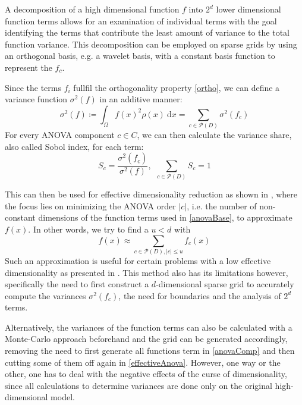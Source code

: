 \documentclass[
  a4paper,  %
  twoside,  %
  bibliography=totoc,
  headsepline,
  cleardoublepage=empty,
  parskip=half,
  draft=false
]{scrbook}
\begin{document}
A decomposition of a high dimensional function $f$ into $2^d$ lower dimensional function terms allows for an examination of individual terms with the goal identifying the terms that contribute the least amount of variance to the total function variance.
This decomposition can be employed on sparse grids by using an orthogonal basis, e.g. a wavelet basis, with a constant basis function to represent the $f_c$.

Since the terms $f_i$ fullfil the orthogonality property \eqref{ortho}, we can define a variance function $\sigma^2(f)$ in an additive manner:
\begin{equation}
\sigma^2(f) \coloneqq \int_{\Omega} f(x)^2 \rho(x) ~ \text{d} x=\sum_{c \in \mathcal{P}(D)} \sigma^2(f_c)
\end{equation}
For every ANOVA component $c \in C$, we can then calculate the variance share, also called Sobol index, for each term:
\begin{equation}
S_{c}=\frac{\sigma^2(f_{\underline{c}} )}{\sigma^2(f)}, ~~ \sum_{c \in \mathcal{P}(D)} S_{c} = 1
\nonumber
\end{equation}

This can then be used for effective dimensionality reduction as shown in \cite{G13,F10}, where the focus lies on minimizing the ANOVA order $|c|$, i.e. the number of non-constant dimensions of the function terms used in \eqref{anovaBase}, to approximate $f(x)$.
In other words, we try to find a $u < d$ with
\begin{equation}
f(x) \approx \sum_{c \in \mathcal{P}(D), |c| \leq u} f_c(x)
\label{effectiveAnova}
\end{equation}
Such an approximation is useful for certain problems with a low effective dimensionality as presented in \cite{H08}.
This method also has its limitations however, specifically the need to first construct a $d$-dimensional sparse grid to accurately compute the variances $\sigma^2(f_c)$, the need for boundaries and the analysis of $2^d$ terms.

Alternatively, the variances of the function terms can also be calculated with a Monte-Carlo approach \cite{} beforehand and the grid can be generated accordingly, removing the need to first generate all functions term in \ref{anovaComp} and then cutting some of them off again in \ref{effectiveAnova}.
However, one way or the other, one has to deal with the negative effects of the curse of dimensionality, since all calculations to determine variances are done only on the original high-dimensional model.
\end{document}
